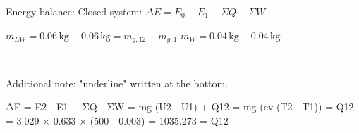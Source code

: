 Energy balance:  
Closed system:  
\( \Delta E = E_0 - E_1 - \Sigma Q - \Sigma \dot{W} \)  

\( m_{EW} = 0.06 \, \text{kg} - 0.06 \, \text{kg} = m_{g,12} - m_{g,1} \)  
\( m_{W} = 0.04 \, \text{kg} - 0.04 \, \text{kg} \)  

---

Additional note:  
"underline" written at the bottom.

ΔE = E2 - E1 + ΣQ - ΣW  
= mg (U2 - U1) + Q12  
= mg (cv (T2 - T1)) = Q12  
= 3.029 × 0.633 × (500 - 0.003) = 1035.273 = Q12